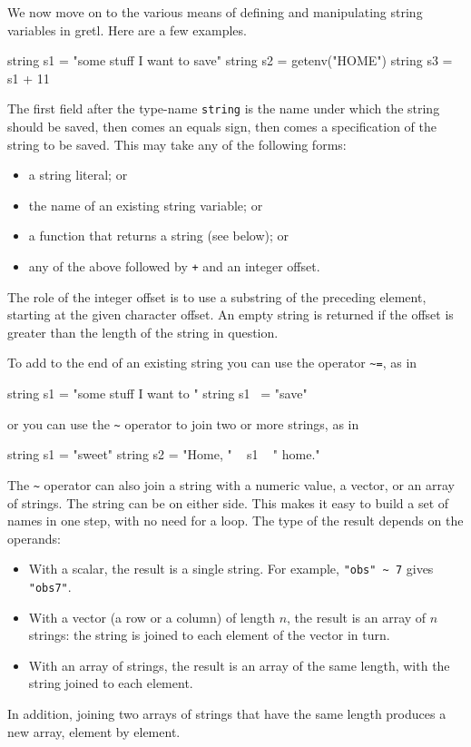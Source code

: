 We now move on to the various means of defining and manipulating string
variables in gretl. Here are a few examples.

%
\begin{code}
string s1 = "some stuff I want to save"
string s2 = getenv("HOME")
string s3 = s1 + 11
\end{code}
%
The first field after the type-name \texttt{string} is the name under
which the string should be saved, then comes an equals sign, then
comes a specification of the string to be saved. This may take any of
the following forms:

\begin{itemize}
\item a string literal; or
\item the name of an existing string variable; or
\item a function that returns a string (see below); or
\item any of the above followed by \texttt{+} and an integer offset.
\end{itemize}

The role of the integer offset is to use a substring of the preceding
element, starting at the given character offset.  An empty string is
returned if the offset is greater than the length of the string in
question.

To add to the end of an existing string you can use the operator
\verb|~=|, as in
%
\begin{code}
string s1 = "some stuff I want to "
string s1 ~= "save"
\end{code}
or you can use the \verb|~| operator to join two or more strings, as
in
\begin{code}
string s1 = "sweet"
string s2 = "Home, " ~ s1 ~ " home."
\end{code}

The \verb|~| operator can also join a string with a numeric value, a
vector, or an array of strings. The string can be on either side.
This makes it easy to build a set of names in one step, with no need
for a loop. The type of the result depends on the operands:
\begin{itemize}
\item With a scalar, the result is a single string. For example,
  \verb|"obs" ~ 7| gives \texttt{"obs7"}.
\item With a vector (a row or a column) of length $n$, the result
  is an array of $n$ strings: the string is joined to each element of
  the vector in turn.
\item With an array of strings, the result is an array of the same
  length, with the string joined to each element.
\end{itemize}
In addition, joining two arrays of strings that have the same length
produces a new array, element by element.

